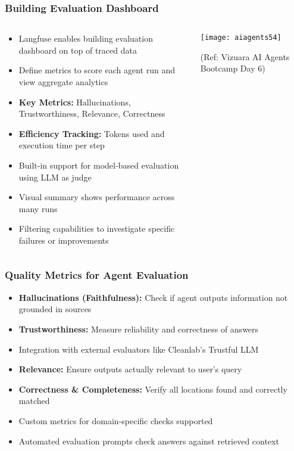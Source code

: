 \begin{frame}[fragile]\frametitle{Building Evaluation Dashboard}
\begin{columns}
    \begin{column}[T]{0.6\linewidth}
      \begin{itemize}
		\item Langfuse enables building evaluation dashboard on top of traced data
		\item Define metrics to score each agent run and view aggregate analytics
		\item \textbf{Key Metrics:} Hallucinations, Trustworthiness, Relevance, Correctness
		\item \textbf{Efficiency Tracking:} Tokens used and execution time per step
		\item Built-in support for model-based evaluation using LLM as judge
		\item Visual summary shows performance across many runs
		\item Filtering capabilities to investigate specific failures or improvements
	  \end{itemize}
    \end{column}
    \begin{column}[T]{0.4\linewidth}
		\begin{center}
		\texttt{[image: aiagents54]}
		
		{\tiny (Ref: Vizuara AI Agents Bootcamp Day 6)}
		\end{center}	
    \end{column}
  \end{columns}
\end{frame}

\begin{frame}[fragile]\frametitle{Quality Metrics for Agent Evaluation}

      \begin{itemize}
		\item \textbf{Hallucinations (Faithfulness):} Check if agent outputs information not grounded in sources
		\item \textbf{Trustworthiness:} Measure reliability and correctness of answers
		\item Integration with external evaluators like Cleanlab's Trustful LLM
		\item \textbf{Relevance:} Ensure outputs actually relevant to user's query
		\item \textbf{Correctness \& Completeness:} Verify all locations found and correctly matched
		\item Custom metrics for domain-specific checks supported
		\item Automated evaluation prompts check answers against retrieved context
	  \end{itemize}

\end{frame}

